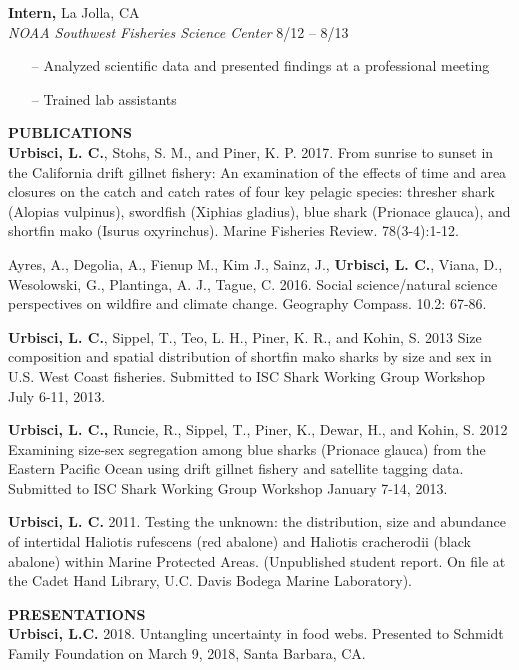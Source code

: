 \begin{vitae}
\textbf{Intern,} La Jolla, CA \\
\textit{NOAA Southwest Fisheries Science Center}		
\hfill
8/12 – 8/13
\vspace{-\topsep}
\begin{itemize}
\setlength{\parskip}{0pt}
\setlength{\itemsep}{0pt plus 1pt}
\item[--] Analyzed scientific data and presented findings at a professional meeting
\item[--] Trained lab assistants 
\end{itemize}
\vspace{-\topsep}
 
\textbf{\uppercase{Publications}} \\
\textbf{Urbisci, L. C.}, Stohs, S. M., and Piner, K. P. 2017. From sunrise to sunset in the California drift gillnet fishery: An examination of the effects of time and area closures on the catch and catch rates of four key pelagic species: thresher shark (Alopias vulpinus), swordfish (Xiphias gladius), blue shark (Prionace glauca), and shortfin mako (Isurus oxyrinchus). Marine Fisheries Review. 78(3-4):1-12. 

Ayres, A., Degolia, A., Fienup M., Kim J., Sainz, J., \textbf{Urbisci, L. C.}, Viana, D., Wesolowski, G., Plantinga, A. J., Tague, C. 2016. Social science/natural science perspectives on wildfire and climate change. Geography Compass. 10.2: 67-86.

\textbf{Urbisci, L. C.}, Sippel, T., Teo, L. H., Piner, K. R., and Kohin, S. 2013 Size composition and spatial distribution of shortfin mako sharks by size and sex in U.S. West Coast fisheries. Submitted to ISC Shark Working Group Workshop July 6-11, 2013. 

\textbf{Urbisci, L. C.,} Runcie, R., Sippel, T., Piner, K., Dewar, H., and Kohin, S. 2012 Examining size-sex segregation among blue sharks (Prionace glauca) from the Eastern Pacific Ocean using drift gillnet fishery and satellite tagging data.  Submitted to ISC Shark Working Group Workshop January 7-14, 2013. 

\textbf{Urbisci, L. C.} 2011. Testing the unknown: the distribution, size and abundance of intertidal Haliotis rufescens (red abalone) and Haliotis cracherodii (black abalone) within Marine Protected Areas. (Unpublished student report. On file at the Cadet Hand Library, U.C. Davis Bodega Marine Laboratory). 


\textbf{\uppercase{Presentations}} \\
\textbf{Urbisci, L.C.} 2018. Untangling uncertainty in food webs. Presented to Schmidt Family Foundation on March 9, 2018, Santa Barbara, CA. 


\end{vitae}
